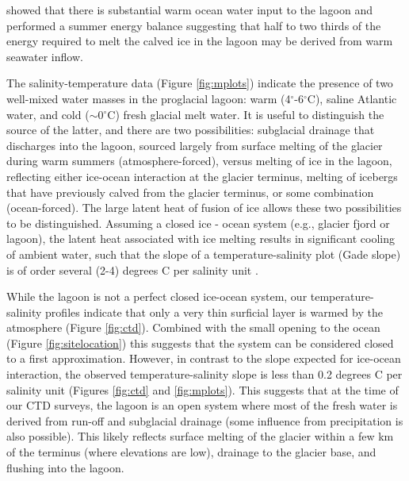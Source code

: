 \documentclass[review]{igs}
\begin{document}
\citet{bjornsson2001jokulsarlon} showed that there is substantial warm ocean water input to the lagoon and performed a summer energy balance suggesting that half to two thirds of the energy required to melt the calved ice in the lagoon may be derived from warm seawater inflow.

The salinity-temperature data (Figure \ref{fig:mplots}) indicate the presence of two well-mixed water masses in the proglacial lagoon: warm (4$^{\circ}$-6$^{\circ}$C), saline Atlantic water, and cold ($\sim$0$^{\circ}$C) fresh glacial melt water.  It is useful to distinguish the source of the latter, and there are two possibilities: subglacial drainage that discharges into the lagoon, sourced largely from surface melting of the glacier during warm summers (atmosphere-forced), versus melting of ice in the lagoon, reflecting either ice-ocean interaction at the glacier terminus, melting of icebergs that have previously calved from the glacier terminus, or some combination (ocean-forced).  The large latent heat of fusion of ice allows these two possibilities to be distinguished.  Assuming a closed ice - ocean system (e.g., glacier fjord or lagoon), the latent heat associated with ice melting results in significant cooling of ambient water, such that the slope of a temperature-salinity plot (Gade slope) is of order several (2-4) degrees C per salinity unit \citep{gade1979,
jenkins1999impact, mortensen2013}.  

While the lagoon is not a perfect closed ice-ocean system, our temperature-salinity profiles indicate that only a very thin surficial layer is warmed by the atmosphere (Figure \ref{fig:ctd}). Combined with the small opening to the ocean (Figure \ref{fig:sitelocation}) this suggests that the system can be considered closed to a first approximation.  However, in contrast to the slope expected for ice-ocean interaction, the observed temperature-salinity slope is less than 0.2 degrees C per salinity unit (Figures \ref{fig:ctd} and \ref{fig:mplots}).  This suggests that at the time of our CTD surveys, the lagoon is an open system where most of the fresh water is derived from run-off and subglacial drainage (some influence from precipitation is also possible). This likely reflects surface melting of the glacier within a few km of the terminus (where elevations are low), drainage to the glacier base, and flushing into the lagoon. 
\end{document}
